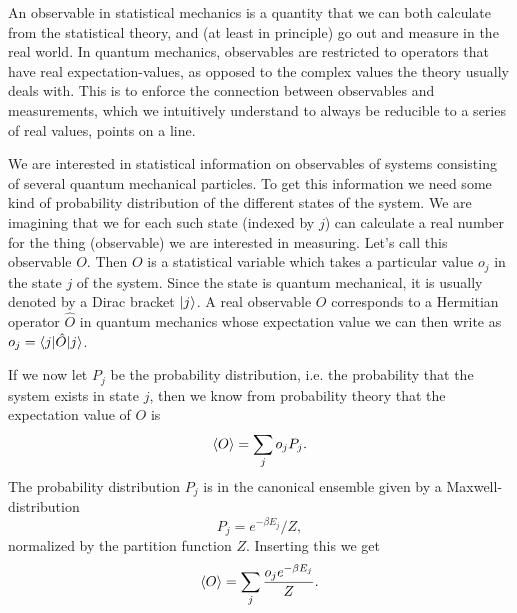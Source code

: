 An observable in statistical mechanics is a quantity that we can both calculate from the statistical theory,
and (at least in principle) go out and measure in the real world. In quantum mechanics, observables
are restricted to operators that have real expectation-values, as opposed to the complex values the theory usually
deals with. This is to enforce the connection between observables and measurements, which we intuitively understand
to always be reducible to a series of real values, \ie points on a line.

We are interested in statistical information on observables of systems consisting of several quantum mechanical particles.
To get this information we need some kind of probability distribution of the
different states of the system. We are imagining that we for each such state (indexed by $j$) can calculate
a real number for the thing (observable) we are interested in measuring. Let's call this observable $O$. Then
$O$ is a statistical variable which takes a particular value $o_j$ in the state $j$ of the system. Since the state is
quantum mechanical, it is usually denoted by a Dirac bracket $\lvert j \rangle$. A real observable $O$ corresponds to a
Hermitian operator $\hat{O}$ in quantum mechanics whose expectation value we can then write as $o_j = \langle j \rvert\hat{O}\lvert j \rangle$.

If we
now let $P_j$ be the probability distribution, i.e. the probability that the system exists in state $j$, then
we know from probability theory that the expectation value of $O$ is
\begin{equation}
    \label{eq:statMech:statMean}
    \langle O \rangle = \sum_jo_jP_j.
\end{equation}
The probability distribution $P_j$ is in the canonical ensemble given by a Maxwell-distribution
\begin{equation}
    \label{eq:statMech:probDist}
    P_j = e^{-\beta E_j}/Z,
\end{equation}
normalized by the partition function $Z$. Inserting this we get
\begin{equation}
    \label{eq:stateMech:statMeanFull}
    \langle O \rangle = \sum_j\frac{o_je^{-\beta E_j}}{Z}.
\end{equation}

